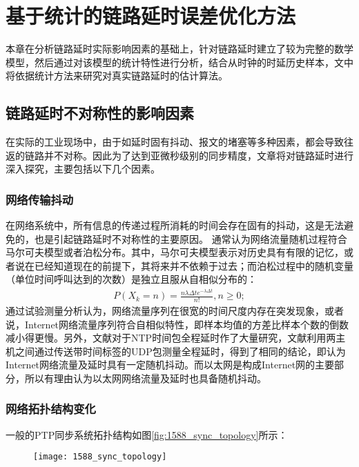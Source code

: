 
\chapter{基于统计的链路延时误差优化方法}
\label{chap:statistical_delay}
本章在分析链路延时实际影响因素的基础上，针对链路延时建立了较为完整的数学模型，然后通过对该模型的统计特性进行分析，结合从时钟的时延历史样本，文中将依据统计方法来研究对真实链路延时的估计算法。

\section{链路延时不对称性的影响因素}
在实际的工业现场中，由于如延时固有抖动、报文的堵塞等多种因素，都会导致往返的链路并不对称。因此为了达到亚微秒级别的同步精度，文章将对链路延时进行深入探究，主要包括以下几个因素。

\subsection{网络传输抖动}
在网络系统中，所有信息的传递过程所消耗的时间会存在固有的抖动，这是无法避免的，也是引起链路延时不对称性的主要原因。
通常认为网络流量随机过程符合马尔可夫模型或者泊松分布。其中，马尔可夫模型表示对历史具有有限的记忆，或者说在已经知道现在的前提下，其将来并不依赖于过去；而泊松过程中的随机变量（单位时间呼叫达到的次数）是独立且服从自相似分布的\supercite{12}：
\begin {align}
P(X_{k} = n) = \frac{n\lambda\Delta t e^{- \lambda\Delta t}}{n!},n\geq 0;
\end{align}
通过试验测量分析认为，网络流量序列在很宽的时间尺度内存在突发现象，或者说，Internet网络流量序列符合自相似特性\supercite{13,14,15,16}，即样本均值的方差比样本个数的倒数减小得更慢。另外，文献\parencite{17}对于NTP时间包全程延时作了大量研究，文献\parencite{18}利用两主机之间通过传送带时间标签的UDP包测量全程延时，得到了相同的结论，即认为Internet网络流量及延时具有一定随机抖动。而以太网是构成Internet网的主要部分，所以有理由认为以太网网络流量及延时也具备随机抖动。

\subsection{网络拓扑结构变化}
一般的PTP同步系统拓扑结构如图\ref{fig:1588_sync_topology}所示：
\begin{figure}[htbp]
  \centering
  \begin{minipage}[b]{0.6\textwidth}
    \captionstyle{\centering}
    \centering
    \texttt{[image: 1588\_sync\_topology]}
  \end{minipage}     
\end{figure}
\\ \\ \\

